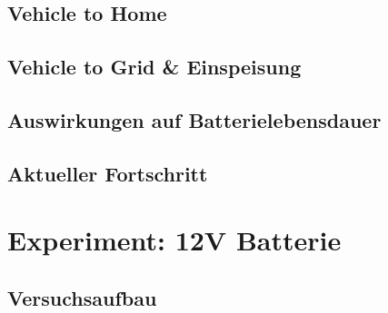 \documentclass[12pt]{article}
\begin{document}
\subsection{Vehicle to Home}

\subsection{Vehicle to Grid \& Einspeisung}

\subsection{Auswirkungen auf Batterielebensdauer}

\subsection{Aktueller Fortschritt}


\section{Experiment: 12V Batterie}

\subsection{Versuchsaufbau}
\end{document}
